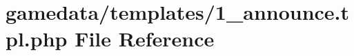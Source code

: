 \hypertarget{1__announce_8tpl_8php}{\section{gamedata/templates/1\+\_\+announce.tpl.\+php File Reference}
\label{1__announce_8tpl_8php}
}
